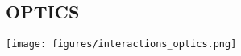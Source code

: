 \subsection{OPTICS}
\label{subsec:opticsresults}

\texttt{[image: figures/interactions\_optics.png]}
